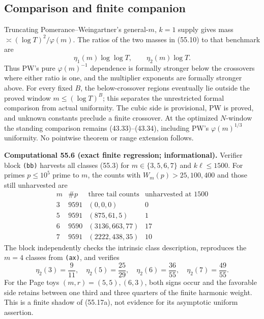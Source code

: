 \documentclass[10pt,reqno]{amsart}
\theoremstyle{definition}
\newcommand{\1}{\mathbf 1}
\begin{document}
\subsection{Comparison and finite companion}
Truncating Pomerance--Weingartner's general-$m$, $k=1$ supply gives mass
$\asymp(\log T)^2/\varphi(m)$.  The ratios of the two masses in (55.10) to
that benchmark are
\begin{equation}\tag{55.19}
              \eta_1(m)\log\log T,
              \qquad \eta_2(m)\log T.
\end{equation}
Thus PW's pure $\varphi(m)^{-1}$ dependence is formally stronger below the
crossovers where either ratio is one, and the multiplier exponents are
formally stronger above.  For every fixed $B$, the below-crossover regions
eventually lie outside the proved window $m\leq(\log T)^B$; this separates
the unrestricted formal comparison from actual uniformity.  The cubic side
is provisional, PW is proved, and unknown constants preclude a finite
crossover.  At the optimized $N$-window the standing comparison remains
(43.33)--(43.34), including PW's $\varphi(m)^{1/3}$ uniformity.  No
pointwise theorem or range extension follows.

\medskip\noindent\textbf{Computational 55.6 (exact finite regression;
informational).}
Verifier block \texttt{(bb)} harvests all classes (55.3) for
$m\in\{3,5,6,7\}$ and $k\ell\leq1500$.  For primes $p\leq10^5$ prime to
$m$, the counts with $W_m(p)>25,100,400$ and those still unharvested are
\begin{equation}\tag{55.20}
\begin{array}{c|c|c|c}
 m&\#p&\text{three tail counts}&\text{unharvested at }1500\\ \hline
 3&9591&(0,0,0)&0\\
 5&9591&(875,61,5)&1\\
 6&9590&(3136,663,77)&17\\
 7&9591&(2222,438,35)&10
\end{array}
\end{equation}
The block independently checks the intrinsic class description, reproduces
the $m=4$ classes from \texttt{(ax)}, and verifies
\begin{equation}\tag{55.21}
 \eta_2(3)=\frac9{11},\quad \eta_2(5)=\frac{25}{29},\quad
 \eta_2(6)=\frac{36}{55},\quad \eta_2(7)=\frac{49}{55}.
\end{equation}
For the Page toys $(m,r)=(5,5),(6,3)$, both signs occur and the favorable
side retains between one third and three quarters of the finite harmonic
weight.  This is a finite shadow of (55.17a), not evidence for its
asymptotic uniform assertion.
\endgroup
\end{document}
